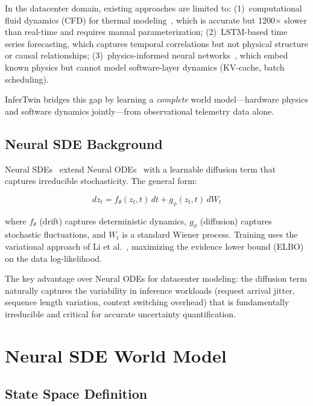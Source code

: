 \documentclass[conference,10pt]{IEEEtran}
\begin{document}
In the datacenter domain, existing approaches are limited to: (1)~computational fluid dynamics (CFD) for thermal modeling~\cite{tao2018digital}, which is accurate but 1200$\times$ slower than real-time and requires manual parameterization; (2)~LSTM-based time series forecasting, which captures temporal correlations but not physical structure or causal relationships; (3)~physics-informed neural networks~\cite{raissi2019physics}, which embed known physics but cannot model software-layer dynamics (KV-cache, batch scheduling).

InferTwin bridges this gap by learning a \emph{complete} world model---hardware physics and software dynamics jointly---from observational telemetry data alone.

\subsection{Neural SDE Background}

Neural SDEs~\cite{li2020scalable} extend Neural ODEs~\cite{chen2018neural} with a learnable diffusion term that captures irreducible stochasticity. The general form:

\begin{equation}
dz_t = f_\theta(z_t, t) \, dt + g_\phi(z_t, t) \, d W_t
\end{equation}

where $f_\theta$ (drift) captures deterministic dynamics, $g_\phi$ (diffusion) captures stochastic fluctuations, and $W_t$ is a standard Wiener process. Training uses the variational approach of Li et al.~\cite{li2020scalable}, maximizing the evidence lower bound (ELBO) on the data log-likelihood.

The key advantage over Neural ODEs for datacenter modeling: the diffusion term naturally captures the variability in inference workloads (request arrival jitter, sequence length variation, context switching overhead) that is fundamentally irreducible and critical for accurate uncertainty quantification.

\section{Neural SDE World Model}
\label{sec:worldmodel}

\subsection{State Space Definition}
\end{document}
